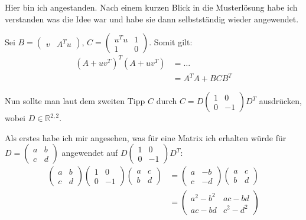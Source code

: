 \documentclass[11pt]{article}
\begin{document}
Hier bin ich angestanden. Nach einem kurzen Blick in die Musterlösung habe ich verstanden was die Idee war und habe sie dann selbstständig wieder angewendet.

Sei $B = \begin{pmatrix}
v & A^Tu
\end{pmatrix}$,
$C = \begin{pmatrix}
u^T u & 1\\
1 & 0
\end{pmatrix}$. Somit gilt:
\begin{align*}
(A + uv^T)^T(A + uv^T) &= \ldots\\
&= A^T A + B C B^T
\end{align*}

Nun sollte man laut dem zweiten Tipp $C$ durch $C = D \begin{pmatrix}
1 & 0 \\ 0 & -1
\end{pmatrix} D^T$ ausdrücken, wobei $D \in \mathbb{R}^{2,2}$.

Als erstes habe ich mir angesehen, was für eine Matrix ich erhalten würde für $D = \begin{pmatrix}
a & b \\ c & d
\end{pmatrix}$ angewendet auf $D \begin{pmatrix}
1 & 0 \\ 0 & -1
\end{pmatrix} D^T$:
\begin{align*}
\begin{pmatrix} a & b \\ c & d \end{pmatrix} \begin{pmatrix} 1 & 0 \\ 0 & -1 \end{pmatrix} \begin{pmatrix} a & c \\ b & d \end{pmatrix} &= \begin{pmatrix} a & -b \\ c & -d \end{pmatrix} \begin{pmatrix} a & c \\ b & d \end{pmatrix}\\
&= \begin{pmatrix} a^2 - b^2 & ac - bd \\ ac - bd & c^2 - d^2 \end{pmatrix}
\end{align*}
\end{document}
